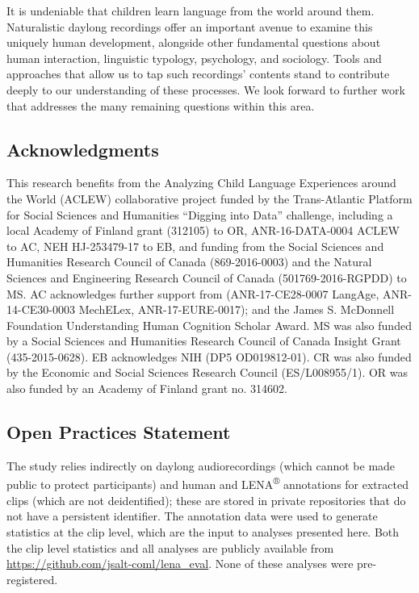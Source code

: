 \documentclass[english,table,man,floatsintext]{apa6}
\begin{document}
It is undeniable that children learn language from the world around them. Naturalistic daylong recordings offer an important avenue to examine this uniquely human development, alongside other fundamental questions about human interaction, linguistic typology, psychology, and sociology. Tools and approaches that allow us to tap such recordings' contents stand to contribute deeply to our understanding of these processes. We look forward to further work that addresses the many remaining questions within this area.

\hypertarget{acknowledgments}{%
\subsection{Acknowledgments}\label{acknowledgments}}

This research benefits from the Analyzing Child Language Experiences around the World (ACLEW) collaborative project funded by the Trans-Atlantic Platform for Social Sciences and Humanities \enquote{Digging into Data} challenge, including a local Academy of Finland grant (312105) to OR, ANR-16-DATA-0004 ACLEW to AC, NEH HJ-253479-17 to EB, and funding from the Social Sciences and Humanities Research Council of Canada (869-2016-0003) and the Natural Sciences and Engineering Research Council of Canada (501769-2016-RGPDD) to MS. AC acknowledges further support from (ANR-17-CE28-0007 LangAge, ANR-14-CE30-0003 MechELex, ANR-17-EURE-0017); and the James S. McDonnell Foundation Understanding Human Cognition Scholar Award. MS was also funded by a Social Sciences and Humanities Research Council of Canada Insight Grant (435-2015-0628). EB acknowledges NIH (DP5 OD019812-01). CR was also funded by the Economic and Social Sciences Research Council (ES/L008955/1). OR was also funded by an Academy of Finland grant no. 314602.

\hypertarget{open-practices-statement}{%
\subsection{Open Practices Statement}\label{open-practices-statement}}

The study relies indirectly on daylong audiorecordings (which cannot be made public to protect participants) and human and LENA\textsuperscript{®} annotations for extracted clips (which are not deidentified); these are stored in private repositories that do not have a persistent identifier. The annotation data were used to generate statistics at the clip level, which are the input to analyses presented here. Both the clip level statistics and all analyses are publicly available from \url{https://github.com/jsalt-coml/lena_eval}. None of these analyses were pre-registered.
\newpage
\end{document}
